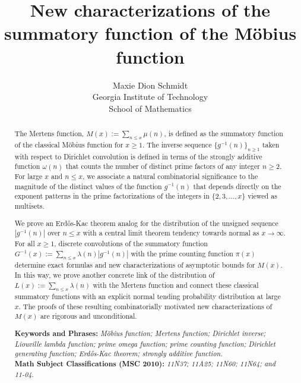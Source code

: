 \documentclass[11pt,reqno,a4letter]{article}
\title{
       \LARGE{
       New characterizations of the summatory function of the M\"obius function 
       } 
}
\author{{\Large Maxie Dion Schmidt} \\ 
        {\normalsize Georgia Institute of Technology} \\[0.025cm] 
        {\normalsize School of Mathematics} 
}
\numberwithin{figure}{section}
\numberwithin{table}{section}
\theoremstyle{plain}
\numberwithin{theorem}{section}
\theoremstyle{definition}
\begin{document}
 

\maketitle

\begin{abstract} 
The Mertens function, $M(x) := \sum_{n \leq x} \mu(n)$, is 
defined as the summatory function of the classical M\"obius function for $x \geq 1$. 
The inverse sequence $\{g^{-1}(n)\}_{n \geq 1}$ 
taken with respect to Dirichlet convolution is defined in terms of the 
strongly additive function $\omega(n)$ that counts the 
number of distinct prime factors of any integer $n \geq 2$. 
For large $x$ and $n \leq x$, we associate a natural combinatorial 
significance to the magnitude of the distinct values of the 
function $g^{-1}(n)$ that depends directly on the exponent patterns in the 
prime factorizations of the integers in $\{2,3,\ldots,x\}$ viewed as multisets. 

We prove an Erd\H{o}s-Kac theorem analog for the distribution of the 
unsigned sequence $|g^{-1}(n)|$ over $n \leq x$ with a central limit theorem 
tendency towards normal as $x \rightarrow \infty$. 
For all $x \geq 1$, discrete convolutions of the summatory function 
$G^{-1}(x) := \sum_{n \leq x} \lambda(n) |g^{-1}(n)|$ with 
the prime counting function $\pi(x)$ determine 
exact formulas and new characterizations of asymptotic bounds for $M(x)$. 
In this way, we prove another concrete link of the distribution of  
$L(x) := \sum_{n \leq x} \lambda(n)$ with the Mertens function and connect these classical 
summatory functions with an explicit normal tending 
probability distribution at large $x$. 
The proofs of these resulting combinatorially motivated new characterizations of $M(x)$ 
are rigorous and unconditional. 

\bigskip 
\noindent
\textbf{Keywords and Phrases:} {\it M\"obius function; Mertens function; 
                                    Dirichlet inverse; Liouville lambda function; prime omega function; 
                                    prime counting function; Dirichlet generating function; 
                                    Erd\H{o}s-Kac theorem; strongly additive function. } \\ 
\textbf{Math Subject Classifications (MSC 2010):} {\it 11N37; 11A25; 11N60; 11N64; and 11-04. } 
\end{abstract} 
\end{document}
